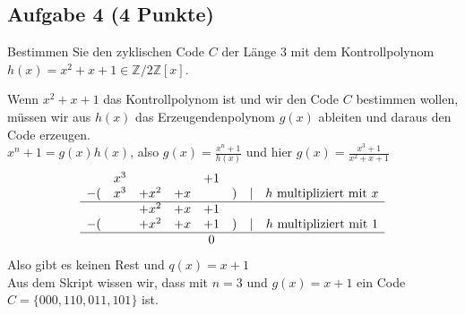 \documentclass{article} %
\begin{document}
\subsection*{Aufgabe 4 (4 Punkte)}  
Bestimmen Sie den zyklischen Code $C$ der Länge 3 mit dem Kontrollpolynom  
$h(x) = x^2 + x + 1 \in \mathbb{Z}/2\mathbb{Z}[x]$.
\begin{mybox}
Wenn $x^2 + x + 1$ das Kontrollpolynom ist und wir den Code $C$ bestimmen wollen, müssen wir aus $h(x)$ das Erzeugendenpolynom $g(x)$ ableiten und daraus den Code erzeugen. \\
$x^n + 1 = g(x)h(x)$, also $g(x) = \frac{x^n + 1}{h(x)}$ und hier $g(x) = \frac{x^3 + 1}{x^2 + x + 1}$
\[
\begin{array}{cccccccccccc}
    & x^3   &       &       & +1 &  \\
-(  & x^3   & + x^2 & + x   &    &) & | & h \text{ multipliziert mit } x\\\hline
    &       & + x^2 & + x   & +1 & \\
-(  &       & + x^2 & + x   & +1 &) & | & h \text{ multipliziert mit } 1 \\\hline
& & & & 0
\end{array}
\]
Also gibt es keinen Rest und $q(x) = x+1$ \\
Aus dem Skript wissen wir, dass mit $n = 3$ und $g(x) = x+1$ ein Code $ C = \{000, 110, 011, 101\}$ ist. 
\end{mybox}
\end{document}
